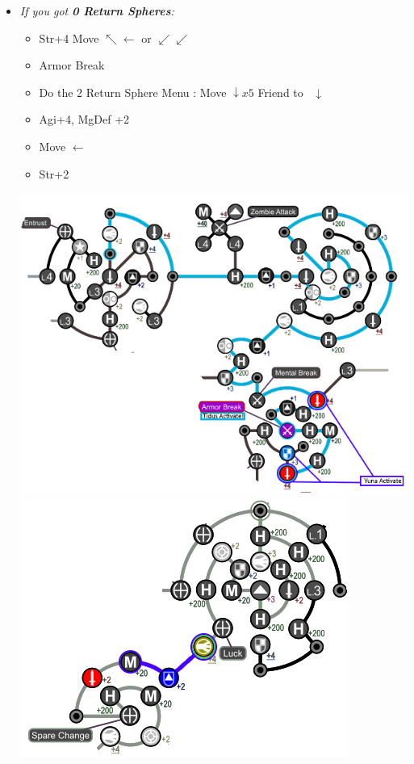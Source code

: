 \begin{spheregrid}
\begin{multicols}{2}
\begin{itemize}
\begin{itemize}
              \columnbreak
        \item \textit{If you got \textbf{0 Return Spheres}:}
              \begin{itemize}
                \tidusf Move to Str+4 by Mental Break $\rightarrow x3, \downarrow, \rightarrow x3$
                \yunaf Friend Sphere to \tidus
                \item Str+4
                \tidusf Move $\nwarrow\leftarrow$ or $\swarrow\swarrow$
                \item Armor Break
                \item Do the 2 Return Sphere Menu
                \rikkuf: Move $\downarrow x5$
                \yunaf Friend to \rikku\ $\downarrow$
                \item Agi+4, MgDef +2
                \item Move $\leftarrow$
                \item Str+2
              \end{itemize}
              \includegraphics[width=.9\columnwidth]{graphics/0_returns}
              \includegraphics[width=.7\columnwidth]{graphics/0_returns_pt2}

\end{itemize}
\end{itemize}
\end{multicols}
\end{spheregrid}
